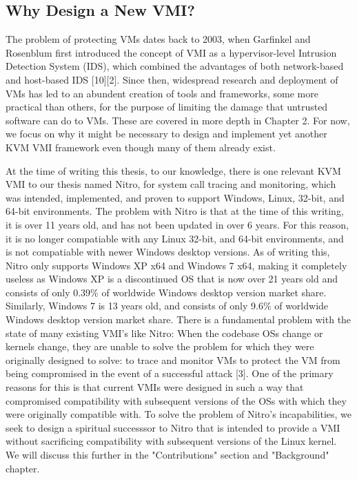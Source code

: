\documentclass{report}
\begin{document}
\begin{spacing}{1.5}
\subsection{Why Design a New VMI?}

{\large
The problem of protecting VMs dates back to 2003, when Garfinkel and Rosenblum first introduced the concept of VMI as a hypervisor-level Intrusion Detection System (IDS), which combined the advantages of both network-based and host-based IDS [10][2]. Since then, widespread research and deployment of VMs has led to an abundent creation of tools and frameworks, some more practical than others, for the purpose of limiting the damage that untrusted software can do to VMs. These are covered in more depth in Chapter 2. For now, we focus on why it might be necessary to design and implement yet another KVM VMI framework even though many of them already exist.
\newline
}


{\large
At the time of writing this thesis, to our knowledge, there is one relevant KVM VMI to our thesis named Nitro, for system call tracing and monitoring, which was intended, implemented, and proven to support Windows, Linux, 32-bit, and 64-bit environments. The problem with Nitro is that at the time of this writing, it is over 11 years old, and has not been updated in over 6 years. For this reason, it is no longer compatiable with any Linux 32-bit, and 64-bit environments, and is not compatiable with newer Windows desktop versions. As of writing this, Nitro only supports Windows XP x64 and Windows 7 x64, making it completely useless as Windows XP is a discontinued OS that is now over 21 years old and consists of only 0.39\% of worldwide Windows desktop version market share. Similarly, Windows 7 is 13 years old, and consists of only 9.6\% of worldwide Windows desktop version market share. There is a fundamental problem with the state of many existing VMI's like Nitro: When the codebase OSs change or kernels change, they are unable to solve the problem for which they were originally designed to solve: to trace and monitor VMs to protect the VM from being compromised in the event of a successful attack [3]. One of the primary reasons for this is that current VMIs were designed in such a way that compromised compatibility with subsequent versions of the OSs with which they were originally compatible with. To solve the problem of Nitro's incapabilities, we seek to design a spiritual successsor to Nitro that is intended to provide a VMI without sacrificing compatibility with subsequent versions of the Linux kernel. We will discuss this further in the "Contributions" section and "Background" chapter.
\newline
}













\end{spacing}
\end{document}
